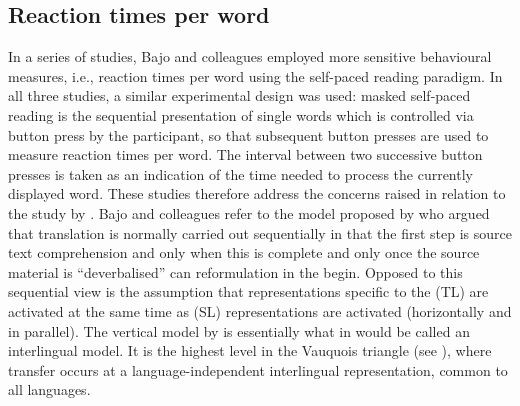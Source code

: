 \documentclass[output=paper]{LSP/langsci}
\begin{document}
\subsection{Reaction times per word}
\largerpage
In a series of studies, Bajo and colleagues \citep{Macizo2004a, Macizo2006b,Ruiz2008Activation} employed more sensitive behavioural measures, i.e., reaction times per word using the self-paced reading paradigm. In all three studies, a similar experimental design was used: masked self-paced reading is the sequential presentation of single words which is controlled via button press by the participant, so that subsequent button presses are used to measure reaction times per word. The interval between two successive button presses is taken as an indication of the time needed to process the currently displayed word. These studies therefore address the concerns raised in relation to the study by \citet{Shreve1993}. Bajo and colleagues \citep{Macizo2004a, Macizo2006b,Ruiz2008Activation} refer to the model proposed by \citet{Seleskovitch1976} who argued that translation is normally carried out sequentially in that the first step is source text comprehension and only when this is complete and only once the source material is ``deverbalised'' can reformulation in the  begin. Opposed to this sequential view is the assumption that representations specific to the  (TL) are activated at the same time as  (SL) representations are activated (horizontally and in parallel). The vertical model by \citet{Seleskovitch1976} is essentially what in  would be called an interlingual model. It is the highest level in the Vauquois triangle \citep{Vauquois1968} (see ), where transfer occurs at a language-independent interlingual representation, common to all languages.
\end{document}
